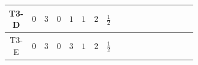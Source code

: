 \documentclass[8pt]{article}
\begin{document}
\begin{landscape}
\begin{longtable}{@{}cccccccc >{\raggedright\arraybackslash}p{0.21\linewidth} >{\raggedright\arraybackslash}p{0.21\linewidth} >{\raggedright\arraybackslash}p{0.21\linewidth}@{}}
\midrule
T3-D & $0$ & $3$ & $0$ & $1$ & $1$ & $2$ & $\frac{1}{2}$ & \scriptsize\adjustbox{max width=\linewidth}{$\begin{gathered} +D_{\mu _1}\left(S_2\right){}^{\dagger } D_{\mu _1}\left(S_2\right)\end{gathered}$} & \scriptsize\adjustbox{max width=\linewidth}{$\begin{gathered} -\frac{\hbar  B_{\mu _1\mu _2}^2}{2 \epsilon }\end{gathered}$} & \scriptsize\adjustbox{max width=\linewidth}{$\begin{gathered} -\frac{\hbar  \left(W_{\mu _1\mu _2}^{A_1}\right){}^2}{2 \epsilon }\end{gathered}$} \\
\midrule
T3-E & $0$ & $3$ & $0$ & $3$ & $1$ & $2$ & $\frac{1}{2}$ & \scriptsize\adjustbox{max width=\linewidth}{$\begin{gathered} +D_{\mu _1}\left(S_{2,j_1}\right){}^{\dagger } D_{\mu _1}\left(S_{2,j_1}\right)\end{gathered}$} & \scriptsize\adjustbox{max width=\linewidth}{$\begin{gathered} -\frac{\hbar  B_{\mu _1\mu _2}^2}{2 \epsilon }\end{gathered}$} & \scriptsize\adjustbox{max width=\linewidth}{$\begin{gathered} -\frac{\hbar  \left(W_{\mu _1\mu _2}^{A_1}\right){}^2}{2 \epsilon }\end{gathered}$} \\
\midrule
\bottomrule
\end{longtable}
\clearpage

\end{landscape}
\end{document}
